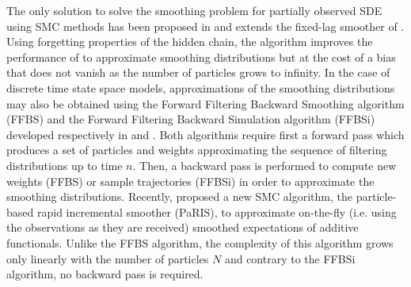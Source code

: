 \documentclass[12pt]{article}
\newcommand{\1}{\mathrm{1}}
\begin{document}
 The only solution to solve the smoothing problem for partially observed SDE using SMC methods has been proposed in \cite{olsson:strojby:2011} and extends the fixed-lag smoother of \cite{olsson:cappe:douc:moulines:2008}. 
 Using forgetting properties of the hidden chain, the algorithm improves the performance of \cite{fearnhead:papaspiliopoulos:roberts:2008} to approximate smoothing distributions but at the cost of a bias that does not vanish as the number of particles grows to infinity.
In the case of discrete time state space models, approximations of the smoothing distributions may also be obtained using the Forward Filtering Backward Smoothing algorithm (FFBS) and  the Forward Filtering Backward Simulation algorithm (FFBSi) developed respectively in \cite{kitagawa:1996,huerzeler:kunsch:1998,doucet:godsill:andrieu:2000} and \cite{godsill:doucet:west:2004}. 
Both algorithms require first a forward pass which produces a set of particles and weights approximating the sequence of filtering distributions up to time $n$. Then, a backward pass is performed to compute new weights (FFBS) or sample trajectories (FFBSi) in order to approximate the smoothing distributions. 
Recently, \cite{olsson:westerborn:2016} proposed a new SMC algorithm, the particle-based rapid incremental smoother (PaRIS), to approximate on-the-fly (i.e. using the observations as they are received) smoothed expectations of additive functionals. 
Unlike the FFBS algorithm, the complexity of this algorithm grows only linearly with the number of particles $N$ and contrary to the FFBSi algorithm, no backward pass is required. 
\end{document}
